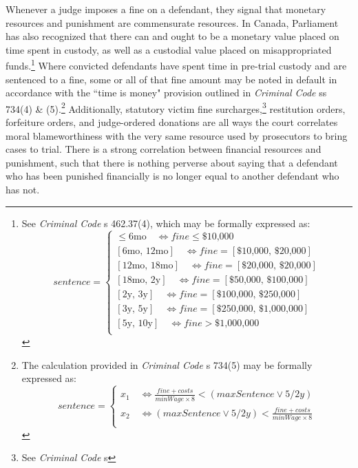 Whenever a judge imposes a fine on a defendant, they signal that monetary resources and punishment are commensurate resources. In Canada, Parliament has also recognized that there can and ought to be a monetary value placed on time spent in custody, as well as a custodial value placed on misappropriated funds.\footnote{See \textit{Criminal Code} s 462.37(4), which may be formally expressed as: 
\begin{equation*}
    sentence = \begin{cases}
        \le \text{6mo} \quad  \iff fine \le \text{\$10,000} \\
	[\text{6mo, 12mo}] \quad \iff fine = [\text{\$10,000, \$20,000}]\\
	[\text{12mo, 18mo}] \quad \iff fine = [\text{\$20,000, \$20,000}]\\
	[\text{18mo, 2y}] \quad \iff fine = [\text{\$50,000, \$100,000}]\\
	[\text{2y, 3y}] \quad \iff fine = [\text{\$100,000, \$250,000}]\\
	[\text{3y, 5y}] \quad \iff fine = [\text{\$250,000, \$1,000,000}]\\
	[\text{5y, 10y}] \quad \iff fine > \text{\$1,000,000}\\
    \end{cases}
\end{equation*}} 
Where convicted defendants have spent time in pre-trial custody and are sentenced to a fine, some or all of that fine amount may be noted in default in accordance with the ``time is money" provision outlined in \textit{Criminal Code} ss 734(4) \& (5).\footnote{The calculation provided in \textit{Criminal Code} s 734(5) may be formally expressed as: 
\begin{equation*}
    sentence =\begin{cases}
        x_1 \quad  \iff \frac{fine + costs}{minWage \times 8} < (maxSentence \lor 5/2y) \\
        x_2 \quad \iff (maxSentence \lor 5/2y) < \frac{fine + costs}{minWage \times 8}  \\
    \end{cases}
\end{equation*}}
Additionally, statutory victim fine surcharges,\footnote{See \textit{Criminal Code} s } restitution orders, forfeiture orders, and judge-ordered donations are all ways the court correlates moral blameworthiness with the very same resource used by prosecutors to bring cases to trial. There is a strong correlation between financial resources and punishment, such that there is nothing perverse about saying that a defendant who has been punished financially is no longer equal to another defendant who has not.


